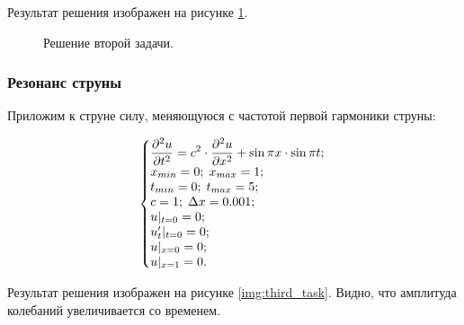 \documentclass[12pt,a4paper,russian]{report}
\begin{document}
	Результат решения изображен на рисунке \ref{img:second_task}.
	
	\begin{figure}[h]
		\caption{Решение второй задачи.}
		\label{img:second_task}
	\end{figure}
	
	\newpage
	\subsubsection{Резонанс струны}
	
	Приложим к струне силу, меняющуюся с частотой первой гармоники струны:
	
	\begin{equation*}
		\left\{\begin{array}{@{}l@{}}
			\displaystyle \frac{\partial^2u}{\partial t^2} = c^2 \cdot \frac{\partial^2u}{\partial x^2} + \sin \pi x \cdot \sin \pi t; \\
			x_{min} = 0; \; x_{max} = 1; \\
			t_{min} = 0; \; t_{max} = 5; \\
			c = 1; \;  \Delta x = 0.001; \\
			u|_{t=0} = 0; \\
			u'_{t}|_{t=0} = 0; \\
			u|_{x=0} = 0; \\
			u|_{x=1} = 0.
		\end{array}\right.\,
	\end{equation*}
	
	Результат решения изображен на рисунке \ref{img:third_task}. Видно, что амплитуда колебаний увеличивается со временем.
	
\end{document}
